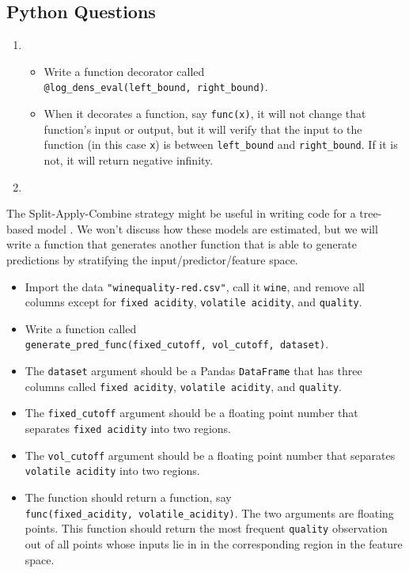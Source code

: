 \documentclass[12pt,krantz2]{krantz}
\providecommand{\tightlist}{%
  \setlength{\itemsep}{0pt}\setlength{\parskip}{0pt}}
\begin{document}
\hypertarget{python-questions-11}{%
\subsection{Python Questions}\label{python-questions-11}}

\begin{enumerate}
\def\labelenumi{\arabic{enumi}.}
\item
  \begin{itemize}
  \tightlist
  \item
    Write a function decorator called \texttt{@log\_dens\_eval(left\_bound,\ right\_bound)}.
  \item
    When it decorates a function, say \texttt{func(x)}, it will not change that function's input or output, but it will verify that the input to the function (in this case \texttt{x}) is between \texttt{left\_bound} and \texttt{right\_bound}. If it is not, it will return negative infinity.
  \end{itemize}
\item
\end{enumerate}

The Split-Apply-Combine strategy might be useful in writing code for a tree-based model \citep{trees}. We won't discuss how these models are estimated, but we will write a function that generates another function that is able to generate predictions by stratifying the input/predictor/feature space.

\begin{itemize}
\tightlist
\item
  Import the data \texttt{"winequality-red.csv"}, call it \texttt{wine}, and remove all columns except for \texttt{fixed\ acidity}, \texttt{volatile\ acidity}, and \texttt{quality}.
\item
  Write a function called \texttt{generate\_pred\_func(fixed\_cutoff,\ vol\_cutoff,\ dataset)}.
\item
  The \texttt{dataset} argument should be a Pandas \texttt{DataFrame} that has three columns called \texttt{fixed\ acidity}, \texttt{volatile\ acidity}, and \texttt{quality}.
\item
  The \texttt{fixed\_cutoff} argument should be a floating point number that separates \texttt{fixed\ acidity} into two regions.
\item
  The \texttt{vol\_cutoff} argument should be a floating point number that separates \texttt{volatile\ acidity} into two regions.
\item
  The function should return a function, say \texttt{func(fixed\_acidity,\ volatile\_acidity)}. The two arguments are floating points. This function should return the most frequent \texttt{quality} observation out of all points whose inputs lie in in the corresponding region in the feature space.
\end{itemize}
\end{document}
